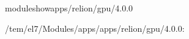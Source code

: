 \documentclass[a4paper,11pt,english]{sphinxmanual}
\begin{document}
\begin{sphinxVerbatim}[commandchars=\\\{\}]
\PYGZdl{}\PYGZgt{}moduleshowapps/relion/gpu/4.0.0

\PYGZhy{}\PYGZhy{}\PYGZhy{}\PYGZhy{}\PYGZhy{}\PYGZhy{}\PYGZhy{}\PYGZhy{}\PYGZhy{}\PYGZhy{}\PYGZhy{}\PYGZhy{}\PYGZhy{}\PYGZhy{}\PYGZhy{}\PYGZhy{}\PYGZhy{}\PYGZhy{}\PYGZhy{}\PYGZhy{}\PYGZhy{}\PYGZhy{}\PYGZhy{}\PYGZhy{}\PYGZhy{}\PYGZhy{}\PYGZhy{}\PYGZhy{}\PYGZhy{}\PYGZhy{}\PYGZhy{}\PYGZhy{}\PYGZhy{}\PYGZhy{}\PYGZhy{}\PYGZhy{}\PYGZhy{}\PYGZhy{}\PYGZhy{}\PYGZhy{}\PYGZhy{}\PYGZhy{}\PYGZhy{}\PYGZhy{}\PYGZhy{}\PYGZhy{}\PYGZhy{}\PYGZhy{}\PYGZhy{}\PYGZhy{}\PYGZhy{}\PYGZhy{}\PYGZhy{}\PYGZhy{}\PYGZhy{}\PYGZhy{}\PYGZhy{}\PYGZhy{}\PYGZhy{}\PYGZhy{}\PYGZhy{}\PYGZhy{}\PYGZhy{}\PYGZhy{}\PYGZhy{}\PYGZhy{}\PYGZhy{}
/tem/el7/Modules/apps/apps/relion/gpu/4.0.0:


\end{sphinxVerbatim}
\end{document}
